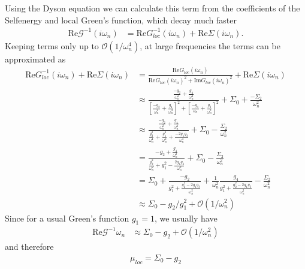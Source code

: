 \documentclass[12pt,a4paper]{scrartcl}
\numberwithin{equation}{section}
\begin{document}
Using the Dyson equation we can calculate this term from the coefficients of the
Selfenergy and local Green's function, which decay much faster
\begin{align}
 \mathrm{Re}\mathscr{G}^{-1}(i\omega_n)
 &= \mathrm{Re}G^{-1}_{loc}(i\omega_n) + \mathrm{Re}\Sigma(i\omega_n).
\end{align}
Keeping terms only up to $\mathcal{O}(1/\omega_n^4)$, at large frequencies the terms can be approximated as
\begin{align}
 \mathrm{Re}G^{-1}_{loc}(i\omega_n) + \mathrm{Re}\Sigma(i\omega_n)
 &= \frac{\mathrm{Re}G_{loc}(i\omega_n)}{\mathrm{Re}G_{loc}(i\omega_n)^2+\mathrm{Im}G_{loc}(i\omega_n)^2}
     + \mathrm{Re}\Sigma(i\omega_n)\\
%
&\approx \frac{ \frac{-g_2}{\omega_n^2} + \frac{g_4}{\omega_n^4}  }
              { \left[ \frac{-g_2}{\omega_n^2} + \frac{g_4}{\omega_n^4} \right]^2
             +  \left[ \frac{-g_1}{\omega_n}     + \frac{g_3}{\omega_n^3} \right]^2}
     + \Sigma_0 + \frac{-\Sigma_2}{\omega_n^2} \\
%     
&\approx \frac{ \frac{-g_2}{\omega_n^2} + \frac{g_4}{\omega_n^4}  }
              { \frac{g_2^2}{\omega_n^4}
             +   \frac{g_1^2}{\omega_n^2}  + \frac{-2g_1g_3}{\omega_n^4} }
     + \Sigma_0 - \frac{\Sigma_2}{\omega_n^2} \\
%     
&= \frac{ -g_2 + \frac{g_4}{\omega_n^2}  }{ \frac{g_2^2}{\omega_n^2}
             +   g_1^2  - \frac{2g_1g_3}{\omega_n^2} }
     + \Sigma_0 - \frac{\Sigma_2}{\omega_n^2} \\
%     
&= \Sigma_0 + \frac{ -g_2}{ g_1^2 +  \frac{g_2^2-2g_1g_3}{\omega_n^2} }
         + \frac{1}{\omega_n^2} \frac{ g_4 }{ g_1^2 +  \frac{g_2^2-2g_1g_3}{\omega_n^2} }
     - \frac{\Sigma_2}{\omega_n^2} \\
%
&\approx \Sigma_0 - g_2/g_1^2
         + \mathcal{O}(1/\omega_n^2)
%
\end{align}
Since for a usual Green's function $g_1=1$, we usually have 
\begin{align}
 \mathrm{Re}\mathscr{G}^{-1}\omega_n
&\approx \Sigma_0 - g_2
         + \mathcal{O}(1/\omega_n^2)
%
\end{align}
and therefore
\begin{align}
 \mu_{loc} = \Sigma_0 - g_2
\end{align}



\end{document}
